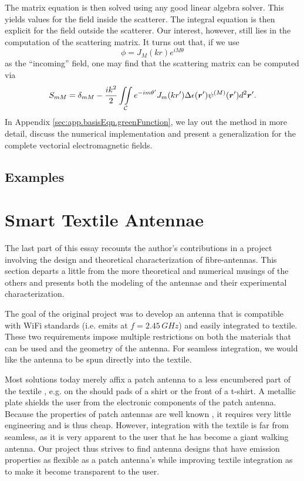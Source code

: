 The matrix equation is then solved using any good 
linear algebra solver. This yields values for the
field inside the scatterer. The integral equation
is then explicit for the field outside the scatterer. 
Our interest, however, still lies in the computation
of the scattering matrix. It turns out that, if we
use 
	\begin{equation}
		\phi = J_M(kr)e^{iM\theta}
	\end{equation}
as the ``incoming'' field, one may find that the scattering
matrix can be computed via
	\begin{equation}
		S_{mM} = \delta_{mM} - \frac{ik^2}{2}\mathop{\iint}_\mathcal{C}e^{-im{\theta'}}J_m(kr')\Delta\epsilon(\boldsymbol{r}')\psi^{(M)}(\boldsymbol{r}')d^2\boldsymbol{r}'.
	\end{equation}
In Appendix \ref{sec:app.basisEqn.greenFunction}, we lay out the method in more detail, 
discuss the numerical implementation and present a generalization for the complete 
vectorial electromagnetic fields.

\subsection{Examples}

\section{Smart Textile Antennae}
The last part of this essay recounts the author's contributions
in a project involving the design and theoretical characterization
of fibre-antennas. This section departs a little from the more theoretical
and numerical musings of the others and presents both the modeling of the 
antennae and their experimental characterization.   

The goal of the original project was to develop an antenna that is compatible with 
WiFi standards (i.e. emits at $f=2.45\,\unit{GHz}$) and easily integrated
to textile. These two requirements impose multiple restrictions on both
the materials that can be used and the geometry of the antenna. For seamless
integration, we would like the antenna to be spun directly into the textile. 

Most solutions today merely affix a patch antenna to a less 
encumbered part of the textile \cite{JAI2013}, e.g. on the should pads of a shirt
or the front of a t-shirt.
A metallic plate shields the user from the electronic components 
of the patch antenna. Because the properties of patch antennas are
well known \cite{ELL2003}, it requires very little engineering and is thus cheap. However, integration 
with the textile is far from seamless, as it is very apparent to the
user that he has become a giant walking antenna. Our project thus 
strives to find antenna designs that have emission properties
as flexible as a patch antenna's while improving textile integration
as to make it become transparent to the user.

